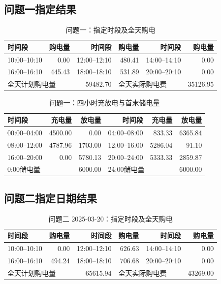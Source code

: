 \subsection{问题一指定结果}
\begin{table}[htbp]\centering\scriptsize
\caption{问题一：指定时段及全天购电}
\begin{tabular}{lrrrrr}\toprule
时间段 & 购电量 & 时间段 & 购电量 & 时间段 & 购电量\\\midrule
10:00--10:10 & 0.00 & 12:00--12:10 & 480.41 & 14:00--14:10 & 0.00\\
16:00--16:10 & 445.43 & 18:00--18:10 & 531.89 & 20:00--20:10 & 0.00\\
\multicolumn{2}{l}{全天计划购电量} & 59482.70 & \multicolumn{2}{l}{全天实际购电费} & 35126.95\\
\bottomrule\end{tabular}\end{table}

\begin{table}[htbp]\centering\scriptsize
\caption{问题一：四小时充放电与首末储电量}
\begin{tabular}{lrrrrr}\toprule
时间段 & 充电量 & 放电量 & 时间段 & 充电量 & 放电量\\\midrule
00:00--04:00 & 4500.00 & 0.00 & 04:00--08:00 & 833.33 & 6365.84\\
08:00--12:00 & 4787.96 & 1703.00 & 12:00--16:00 & 5286.04 & 91.10\\
16:00--20:00 & 0.00 & 5780.13 & 20:00--24:00 & 5333.33 & 2859.87\\
\multicolumn{2}{l}{0:00储电量} & 6000.00 & \multicolumn{2}{l}{24:00储电量} & 6000.00\\
\bottomrule\end{tabular}\end{table}

\FloatBarrier
\subsection{问题二指定日期结果}
\begin{table}[htbp]\centering\scriptsize
\caption{问题二 2025-03-20：指定时段及全天购电}
\begin{tabular}{lrrrrr}\toprule
时间段 & 购电量 & 时间段 & 购电量 & 时间段 & 购电量\\\midrule
10:00--10:10 & 0.00 & 12:00--12:10 & 626.63 & 14:00--14:10 & 0.00\\
16:00--16:10 & 494.24 & 18:00--18:10 & 706.68 & 20:00--20:10 & 0.00\\
\multicolumn{2}{l}{全天计划购电量} & 65615.94 & \multicolumn{2}{l}{全天实际购电费} & 43269.00\\
\bottomrule\end{tabular}\end{table}

